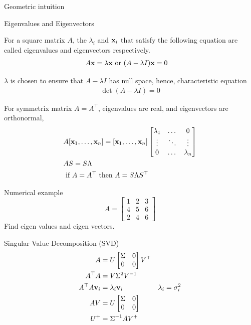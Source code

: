 \documentclass[times,t]{beamer}
\begin{document}
\begin{frame}{Geometric intuition}
\end{frame}

\begin{frame}{Eigenvalues  and Eigenvectors}

For a  square  matrix $A$, the $\lambda_i$ and  $\mathbf{x}_i$ that satisfy  the
following equation are called eigenvalues and  eigenvectors  respectively.
\begin{align}
  A  \mathbf{x} &= \lambda \mathbf{x} \text{ or } (A  - \lambda I)\mathbf{x}  = 0
\end{align}

$\lambda$ is   chosen to ensure  that   $A  -  \lambda I$  has null space,
hence, characteristic   equation
\begin{align}
  \det(A  - \lambda I) = 0 
 \end{align}

 For  symmetrix matrix $A =  A^\top$, eigenvalues  are  real, and eigenvectors
 are orthonormal,
 \begin{align}
   &A[\mathbf{x}_1, \dots,   \mathbf{x}_n]  = [\mathbf{x}_1, \dots,   \mathbf{x}_n]\begin{bmatrix}\lambda_1 &   \dots   &  0 \\
     \vdots   &   \ddots &  \vdots \\
   0 &   \dots  &  \lambda_n \end{bmatrix}
                  \\
   &A  S = S  \Lambda
   \\
   &\text{  if   }  A =  A^\top \text{ then   }  A   = S \Lambda S^\top
   \end{align}


\end{frame}


\begin{frame}{Numerical example}
  \[
  A   =  \begin{bmatrix}
    1 &   2  &  3  \\
    4 & 5 &   6 \\
    2 & 4 &   6
  \end{bmatrix}
  \]
Find eigen values and eigen vectors.
\end{frame}

\begin{frame}{Singular Value  Decomposition (SVD)}
  \begin{align}
    A  &=   U  \begin{bmatrix}\Sigma   &  0  \\   0  &  0 \end{bmatrix} V^\top \\
    A^\top A &= V \Sigma^2  V^{-1} \\
    A^\top A \mathbf{v}_i  &= \lambda_i \mathbf{v}_i & \lambda_i = \sigma_i^2\\
    A V   &= U \begin{bmatrix}\Sigma   &  0  \\   0  &  0 \end{bmatrix}\\
    U^+   &=  \Sigma^{-1}AV^+
    \end{align}
\end{frame}
\end{document}
